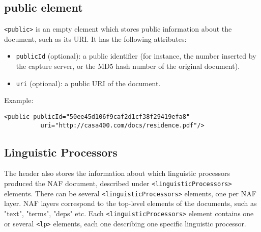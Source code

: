 


\subsection{public element}
\label{sec:public-element}

\texttt{<public>} is an empty element which stores public information about
the document, such as its URI. It has the following attributes:
\begin{itemize}
\item \texttt{publicId} (optional): a public identifier (for instance, the
  number inserted by the capture server, or the MD5 hash number of the
  original document).
\item \texttt{uri} (optional): a public URI of the document.
\end{itemize}

Example:
\begin{Verbatim}[fontsize=\small]
  <public publicId="50ee45d106f9caf2d1cf38f29419efa8"
          uri="http://casa400.com/docs/residence.pdf"/>
\end{Verbatim}

\subsection{Linguistic Processors}
\label{sec:ling-proc}

The header also stores the information about which linguistic processors
produced the NAF document, described under \texttt{<linguisticProcessors>}
elements. There can be several \texttt{<linguisticProcessors>} elements, one
per NAF layer. NAF layers correspond to the top-level elements of the
documents, such as "text", "terms", "deps" etc.  Each
\texttt{<linguisticProcessors>} element contains one or several
\texttt{<lp>} elements, each one describing one specific linguistic
processor.\\

